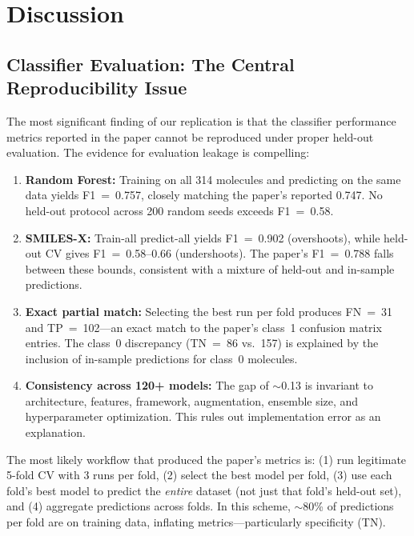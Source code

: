 \documentclass[11pt,a4paper]{article}
\begin{document}
\section{Discussion}
\label{sec:discussion}

\subsection{Classifier Evaluation: The Central Reproducibility Issue}

The most significant finding of our replication is that the classifier performance metrics reported in the paper cannot be reproduced under proper held-out evaluation. The evidence for evaluation leakage is compelling:

\begin{enumerate}[nosep]
    \item \textbf{Random Forest:} Training on all 314 molecules and predicting on the same data yields F1~=~0.757, closely matching the paper's reported 0.747. No held-out protocol across 200 random seeds exceeds F1~=~0.58.

    \item \textbf{SMILES-X:} Train-all predict-all yields F1~=~0.902 (overshoots), while held-out CV gives F1~=~0.58--0.66 (undershoots). The paper's F1~=~0.788 falls between these bounds, consistent with a mixture of held-out and in-sample predictions.

    \item \textbf{Exact partial match:} Selecting the best run per fold produces FN~=~31 and TP~=~102---an exact match to the paper's class~1 confusion matrix entries. The class~0 discrepancy (TN~=~86 vs.\ 157) is explained by the inclusion of in-sample predictions for class~0 molecules.

    \item \textbf{Consistency across 120+ models:} The gap of $\sim$0.13 is invariant to architecture, features, framework, augmentation, ensemble size, and hyperparameter optimization. This rules out implementation error as an explanation.
\end{enumerate}

The most likely workflow that produced the paper's metrics is: (1) run legitimate 5-fold CV with 3 runs per fold, (2) select the best model per fold, (3) use each fold's best model to predict the \textit{entire} dataset (not just that fold's held-out set), and (4) aggregate predictions across folds. In this scheme, $\sim$80\% of predictions per fold are on training data, inflating metrics---particularly specificity (TN).
\end{document}
